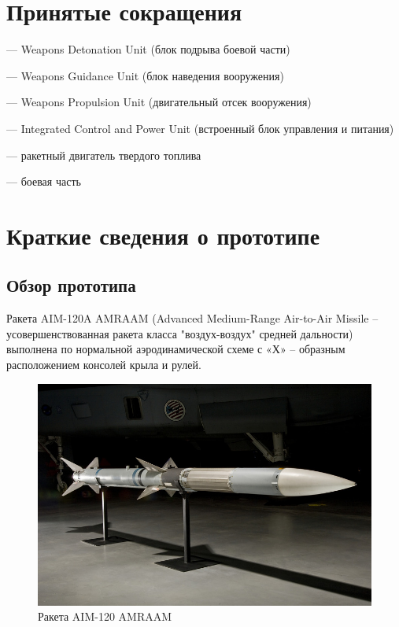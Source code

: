 \documentclass[a4paper,12pt]{report}
\begin{document}
\newpage
\chapter*{Принятые сокращения}
\begin{description}[font=\normalfont\itshape] %
\item[WDU] — Weapons Detonation Unit (блок подрыва боевой части)
\item[WGU] — Weapons Guidance Unit (блок наведения вооружения)
\item[WPU] — Weapons Propulsion Unit (двигательный отсек вооружения)
\item[ICPU] — Integrated Control and Power Unit (встроенный блок управления и питания)
\item[РДТТ] — ракетный двигатель твердого топлива
\item[БЧ] — боевая часть
\end{description}


\newpage
\chapter{Краткие сведения о прототипе}
\section{Обзор прототипа}
Ракета AIM-120A AMRAAM (Advanced Medium-Range Air-to-Air Missile –усовершенствованная ракета класса "воздух-воздух"  средней дальности) выполнена по нормальной аэродинамической схеме с «Х» – образным расположением консолей крыла и рулей.

\begin{figure}[h!]
\centering
\includegraphics[width=0.7\textheight]{images/1.jpg}
\caption{Ракета AIM-120 AMRAAM}
\label{AIM-120}
\end{figure}
\end{document}
